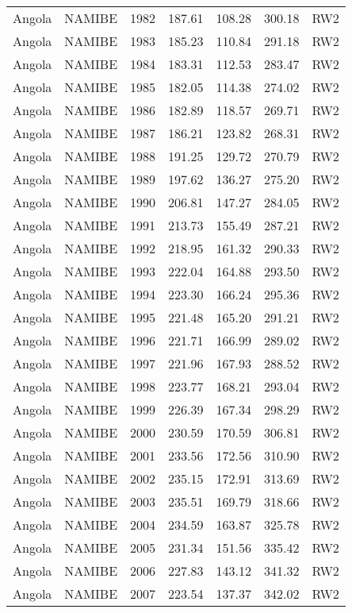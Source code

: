 \begin{longtable}{lllrrrl}
  Angola & NAMIBE & 1982 & 187.61 & 108.28 & 300.18 & RW2 \\ 
  Angola & NAMIBE & 1983 & 185.23 & 110.84 & 291.18 & RW2 \\ 
  Angola & NAMIBE & 1984 & 183.31 & 112.53 & 283.47 & RW2 \\ 
  Angola & NAMIBE & 1985 & 182.05 & 114.38 & 274.02 & RW2 \\ 
  Angola & NAMIBE & 1986 & 182.89 & 118.57 & 269.71 & RW2 \\ 
  Angola & NAMIBE & 1987 & 186.21 & 123.82 & 268.31 & RW2 \\ 
  Angola & NAMIBE & 1988 & 191.25 & 129.72 & 270.79 & RW2 \\ 
  Angola & NAMIBE & 1989 & 197.62 & 136.27 & 275.20 & RW2 \\ 
  Angola & NAMIBE & 1990 & 206.81 & 147.27 & 284.05 & RW2 \\ 
  Angola & NAMIBE & 1991 & 213.73 & 155.49 & 287.21 & RW2 \\ 
  Angola & NAMIBE & 1992 & 218.95 & 161.32 & 290.33 & RW2 \\ 
  Angola & NAMIBE & 1993 & 222.04 & 164.88 & 293.50 & RW2 \\ 
  Angola & NAMIBE & 1994 & 223.30 & 166.24 & 295.36 & RW2 \\ 
  Angola & NAMIBE & 1995 & 221.48 & 165.20 & 291.21 & RW2 \\ 
  Angola & NAMIBE & 1996 & 221.71 & 166.99 & 289.02 & RW2 \\ 
  Angola & NAMIBE & 1997 & 221.96 & 167.93 & 288.52 & RW2 \\ 
  Angola & NAMIBE & 1998 & 223.77 & 168.21 & 293.04 & RW2 \\ 
  Angola & NAMIBE & 1999 & 226.39 & 167.34 & 298.29 & RW2 \\ 
  Angola & NAMIBE & 2000 & 230.59 & 170.59 & 306.81 & RW2 \\ 
  Angola & NAMIBE & 2001 & 233.56 & 172.56 & 310.90 & RW2 \\ 
  Angola & NAMIBE & 2002 & 235.15 & 172.91 & 313.69 & RW2 \\ 
  Angola & NAMIBE & 2003 & 235.51 & 169.79 & 318.66 & RW2 \\ 
  Angola & NAMIBE & 2004 & 234.59 & 163.87 & 325.78 & RW2 \\ 
  Angola & NAMIBE & 2005 & 231.34 & 151.56 & 335.42 & RW2 \\ 
  Angola & NAMIBE & 2006 & 227.83 & 143.12 & 341.32 & RW2 \\ 
  Angola & NAMIBE & 2007 & 223.54 & 137.37 & 342.02 & RW2 \\ 

\end{longtable}
